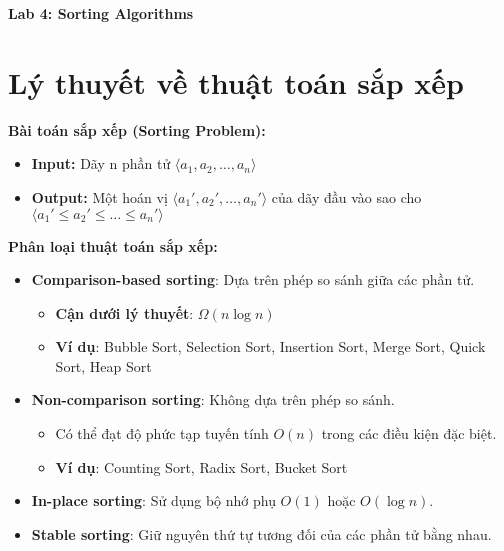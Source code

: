 \documentclass[12pt,a4paper]{article}
\begin{document}
\begin{center}
    {\LARGE \textbf{Lab 4: Sorting Algorithms}}
\end{center}
\vspace{0.5cm}

\section{Lý thuyết về thuật toán sắp xếp}
\textbf{Bài toán sắp xếp (Sorting Problem):}
\begin{itemize}
    \item \textbf{Input:} Dãy n phần tử $\langle a_1, a_2,\dots, a_n \rangle$
    \item \textbf{Output:} Một hoán vị $\langle a_1', a_2',\dots, a_n'\rangle$ của dãy đầu vào 
                           sao cho $\langle a_1' \le a_2'\le \dots \le a_n' \rangle$
\end{itemize}
\textbf{Phân loại thuật toán sắp xếp:}
\begin{itemize}
  \item \textbf{Comparison-based sorting}: Dựa trên phép so sánh giữa các phần tử.
  \begin{itemize}
    \item \textbf{Cận dưới lý thuyết}: $\Omega(n \log n)$
    \item \textbf{Ví dụ}: Bubble Sort, Selection Sort, Insertion Sort, Merge Sort, Quick Sort, Heap Sort
  \end{itemize}

  \item \textbf{Non-comparison sorting}: Không dựa trên phép so sánh.
  \begin{itemize}
    \item Có thể đạt độ phức tạp tuyến tính $O(n)$ trong các điều kiện đặc biệt.
    \item \textbf{Ví dụ}: Counting Sort, Radix Sort, Bucket Sort
  \end{itemize}

  \item \textbf{In-place sorting}: Sử dụng bộ nhớ phụ $O(1)$ hoặc $O(\log n)$.
  \item \textbf{Stable sorting}: Giữ nguyên thứ tự tương đối của các phần tử bằng nhau.
\end{itemize}
\end{document}

